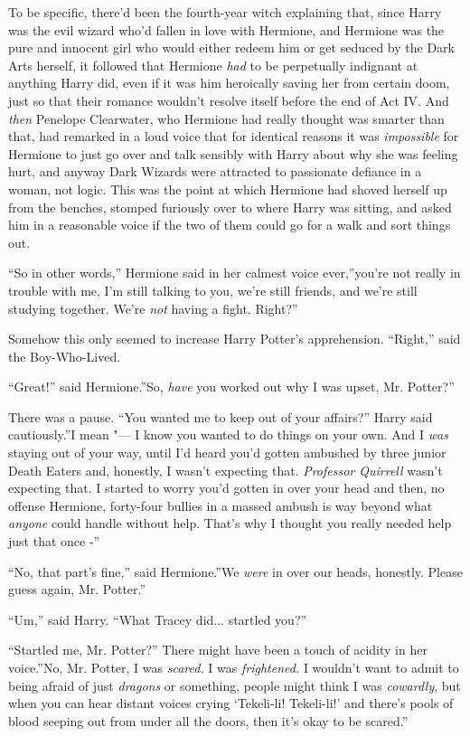 To be specific, there'd been the fourth-year witch explaining that,
since Harry was the evil wizard who'd fallen in love with Hermione, and
Hermione was the pure and innocent girl who would either redeem him or
get seduced by the Dark Arts herself, it followed that Hermione
\emph{had} to be perpetually indignant at anything Harry did, even if it
was him heroically saving her from certain doom, just so that their
romance wouldn't resolve itself before the end of Act IV. And
\emph{then} Penelope Clearwater, who Hermione had really thought was
smarter than that, had remarked in a loud voice that for identical
reasons it was \emph{impossible} for Hermione to just go over and talk
sensibly with Harry about why she was feeling hurt, and anyway Dark
Wizards were attracted to passionate defiance in a woman, not logic.
This was the point at which Hermione had shoved herself up from the
benches, stomped furiously over to where Harry was sitting, and asked
him in a reasonable voice if the two of them could go for a walk and
sort things out.

``So in other words,'' Hermione said in her calmest voice ever,''you're
not really in trouble with me, I'm still talking to you, we're still
friends, and we're still studying together. We're \emph{not} having a
fight. Right?''

Somehow this only seemed to increase Harry Potter's apprehension.
``Right,'' said the Boy-Who-Lived.

``Great!'' said Hermione.''So, \emph{have} you worked out why I was
upset, Mr. Potter?''

There was a pause. ``You wanted me to keep out of your affairs?'' Harry
said cautiously.''I mean "--- I know you wanted to do things on your own.
And I \emph{was} staying out of your way, until I'd heard you'd gotten
ambushed by three junior Death Eaters and, honestly, I wasn't expecting
that. \emph{Professor Quirrell} wasn't expecting that. I started to
worry you'd gotten in over your head and then, no offense Hermione,
forty-four bullies in a massed ambush is way beyond what \emph{anyone}
could handle without help. That's why I thought you really needed help
just that once -''

``No, that part's fine,'' said Hermione.''We \emph{were} in over our
heads, honestly. Please guess again, Mr. Potter.''

``Um,'' said Harry. ``What Tracey did... startled you?''

``Startled me, Mr. Potter?'' There might have been a touch of acidity in
her voice.''No, Mr. Potter, I was \emph{scared.} I was
\emph{frightened.} I wouldn't want to admit to being afraid of just
\emph{dragons} or something, people might think I was \emph{cowardly},
but when you can hear distant voices crying `Tekeli-li! Tekeli-li!' and
there's pools of blood seeping out from under all the doors, then it's
okay to be scared.''

